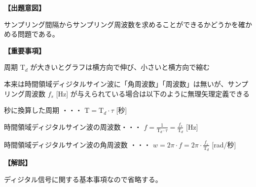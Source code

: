 \noindent \textbf{【出題意図】}

\bigskip
\noindent サンプリング間隔からサンプリング周波数を求めることができるかどうかを確かめる問題である。

\vspace{1em}
\noindent \textbf{【重要事項】}

\bigskip
\noindent 周期 $\textrm{T}_d$ が大きいとグラフは横方向で伸び、小さいと横方向で縮む

\bigskip
\noindent 本来は時間領域ディジタルサイン波に「角周波数」「周波数」は無いが、サンプリング周波数 $f_s$ [Hz] が与えられている場合は以下のように無理矢理定義できる

\bigskip
\noindent 秒に換算した周期 ・・・ $\textrm{T} = \textrm{T}_d \cdot \tau$ [秒]

\bigskip
\noindent 時間領域ディジタルサイン波の周波数・・・ $f = \frac{1}{\textrm{T}_d\cdot\tau} = \frac{f_s}{\textrm{T}_d}$ [Hz]

\bigskip
\noindent 時間領域ディジタルサイン波の角周波数 ・・・ $w = 2\pi \cdot f = 2 \pi \cdot \frac{f_s}{\textrm{T}_d}$ [rad/秒]

\bigskip

\vspace{1em}
\noindent \textbf{【解説】}

\bigskip
\noindent ディジタル信号に関する基本事項なので省略する。
